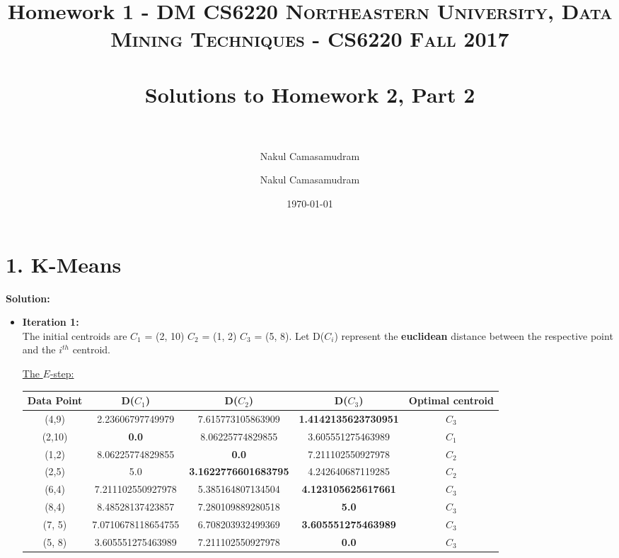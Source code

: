 \documentclass[11pt]{article}
\title{Homework 1 - DM CS6220}
\author{Nakul Camasamudram}
\title{	
	\normalfont \normalsize 
	\textsc{Northeastern University, Data Mining Techniques - CS6220 Fall 2017} \\
	\horrule{0.5pt} \\[0.4cm] %
	\huge Solutions to Homework 2, Part 2 \\ %
	\horrule{2pt} \\[0.5cm] %
	}
\author{Nakul Camasamudram} %
\date{\normalsize\today} %
\begin{document}
	
	\maketitle %
	\newpage
	
	
	\section*{1. K-Means}

	\textbf{Solution:}\\
    
    \begin{itemize}
    	\item \textbf{Iteration 1:} \\
    	The initial centroids are $C_1$ = (2, 10) $C_2$ = (1, 2) $C_3$ = (5, 8). Let D($C_i$) represent the \textbf{euclidean} distance between the respective point and the $i^{th}$ centroid.
    	
		\underline{The $E$-step:} \\
    		\begin{center}
    			\begin{adjustbox}{max width=\textwidth}
				\begin{tabular}{ | c | c | c | c | c |}
	  	 		\hline
    				\textbf{Data Point} & \textbf{D($C_1$)} & \textbf{D($C_2$)} & \textbf{D($C_3$)} & \textbf{Optimal centroid} \\ 
    			\hline
    				(4,9) & 2.23606797749979 & 7.615773105863909 & \textbf{1.4142135623730951} & $C_3$ \\ 
    			\hline
    				(2,10) & \textbf{0.0} & 8.06225774829855 & 3.605551275463989 & $C_1$ \\ 
    			\hline
					(1,2) & 8.06225774829855 & \textbf{0.0} & 7.211102550927978 & $C_2$ \\ 
    			\hline   
    				(2,5) & 5.0 & \textbf{3.1622776601683795} & 4.242640687119285 & $C_2$ \\ 
    			\hline
	    			(6,4) & 7.211102550927978 & 5.385164807134504 & \textbf{4.123105625617661} & $C_3$ \\ 
    			\hline
    				(8,4) & 8.48528137423857 & 7.280109889280518 & \textbf{5.0} & $C_3$ \\ 
    			\hline
    				(7, 5) & 7.0710678118654755 & 6.708203932499369 & \textbf{3.605551275463989} & $C_3$ \\ 
    			\hline 	
    				(5, 8) & 3.605551275463989 & 7.211102550927978 & \textbf{0.0} & $C_3$ \\ 
    			\hline 					
    			\end{tabular}
    			\end{adjustbox}
			\end{center}
		

\end{itemize}
\end{document}
